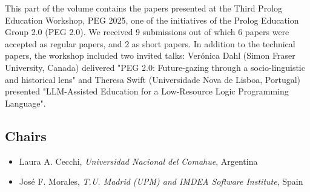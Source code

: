 \documentclass[
]{ceurart}
\begin{document}
\noindent
This part of the volume contains the papers presented at the Third Prolog Education Workshop, PEG 2025, one of the initiatives of the Prolog Education Group 2.0 (PEG 2.0). We received 9 submissions out of which 6 papers were accepted as regular papers, and 2 as short papers. In addition to the technical papers, the workshop included two invited talks: Verónica Dahl (Simon Fraser University, Canada) delivered "PEG 2.0: Future-gazing through a socio-linguistic and historical lens" and Theresa Swift (Universidade Nova de Lisboa, Portugal) presented "LLM-Assisted Education for a Low-Resource Logic Programming Language".


\subsection*{Chairs}
\begin{itemize}
  \item Laura A. Cecchi, \emph{Universidad Nacional del Comahue}, Argentina
  \item José F. Morales, \emph{T.U. Madrid (UPM) and IMDEA Software Institute}, Spain
\end{itemize}
\end{document}
